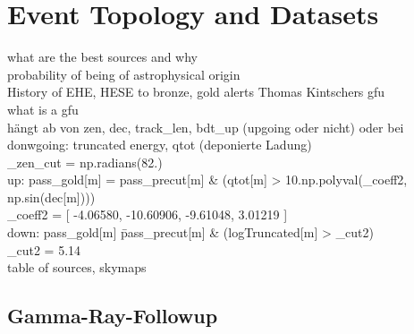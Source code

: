 \chapter{Event Topology and Datasets}
what are the best sources and why\\
probability of being of astrophysical origin\\
History of EHE, HESE to bronze, gold alerts Thomas Kintschers gfu\\
what is a gfu\\
hängt ab von zen, dec, track\_len, bdt\_up (upgoing oder nicht) oder bei donwgoing: truncated energy, qtot (deponierte Ladung)\\
\_zen\_cut = np.radians(82.)\\
up: pass\_gold[m]   = pass\_precut[m] \& (qtot[m] > 10.\*\*np.polyval(\_coeff2, np.sin(dec[m])))\\
\_coeff2 = [  -4.06580, -10.60906,  -9.61048,   3.01219 ]\\
down: pass\_gold[m]   \= pass\_precut[m] \& (logTruncated[m] > \_cut2)\\
\_cut2   = 5.14\\

table of sources, skymaps\\

\section{Gamma-Ray-Followup}

